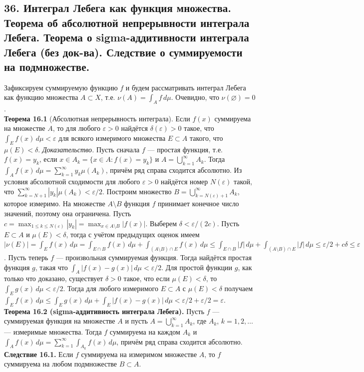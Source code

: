 \documentclass[12pt]{article}
\begin{document}
\subsection*{36. Интеграл Лебега как функция множества. Теорема об абсолютной непрерывности
интеграла Лебега. Теорема о sigma-аддитивности интеграла Лебега (без док-ва). Следствие
о суммируемости на подмножестве.}
Зафиксируем суммируемую функцию $f$ и будем рассматривать интеграл Лебега как функцию множества $A \subset X$, т.е. $\nu(A) = \int_A f\,d\mu$. Очевидно, что $\nu(\varnothing) = 0$. \\\textbf{Теорема 16.1} (Абсолютная непрерывность интеграла). Если $f(x)$ суммируема на множестве $A$, то для любого $\varepsilon > 0$ найдётся $\delta(\varepsilon) > 0$ такое, что $\int_E f(x)\,d\mu < \varepsilon$ для всякого измеримого множества $E \subset A$ такого, что $\mu(E) < \delta$. \textit{Доказательство.} Пусть сначала $f$ — простая функция, т.е. $f(x) = y_k$, если $x \in A_k = \{x \in A : f(x) = y_k\}$ и $A = \bigcup_{k=1}^\infty A_k$. Тогда $\int_A f(x)\,d\mu = \sum_{k=1}^\infty y_k \mu(A_k)$, причём ряд справа сходится абсолютно. Из условия абсолютной сходимости для любого $\varepsilon > 0$ найдётся номер $N(\varepsilon)$ такой, что $\sum_{k=N+1}^\infty |y_k|\mu(A_k) < \varepsilon/2$. Построим множество $B = \bigcup_{k=N(\varepsilon)+1}^\infty A_k$, которое измеримо. На множестве $A \setminus B$ функция $f$ принимает конечное число значений, поэтому она ограничена. Пусть $c = \max_{1 \leq k \leq N(\varepsilon)} |y_k| = \max_{x \in A\setminus B} |f(x)|$. Выберем $\delta < \varepsilon/(2c)$. Пусть $E \subset A$ и $\mu(E) < \delta$, тогда с учётом предыдущих оценок имеем $|\nu(E)| = \int_E f(x)\,d\mu = \int_{E \cap B} f(x)\,d\mu + \int_{(A\setminus B)\cap E} f(x)\,d\mu \leq \int_{E \cap B} |f|\,d\mu + \int_{(A\setminus B)\cap E} |f|\,d\mu \leq \varepsilon/2 + c\delta \leq \varepsilon$. Пусть теперь $f$ — произвольная суммируемая функция. Тогда найдётся простая функция $g$, такая что $\int_A |f(x)-g(x)|\,d\mu < \varepsilon/2$. Для простой функции $g$, как только что доказано, существует $\delta > 0$ такое, что если $\mu(E) < \delta$, то $\int_E g(x)\,d\mu < \varepsilon/2$. Тогда для любого измеримого $E \subset A$ с $\mu(E) < \delta$ получаем $\int_E f(x)\,d\mu \leq \int_E g(x)\,d\mu + \int_E |f(x)-g(x)|\,d\mu < \varepsilon/2 + \varepsilon/2 = \varepsilon$. \\\textbf{Теорема 16.2 (sigma-аддитивность интеграла Лебега).} Пусть $f$ — суммируемая функция на множестве $A$ и пусть $A = \bigcup_{k=1}^\infty A_k$, где $A_k$, $k=1,2,\dots$ — измеримые множества. Тогда $f$ суммируема на каждом $A_k$ и $\int_A f(x)\,d\mu = \sum_{k=1}^\infty \int_{A_k} f(x)\,d\mu$, причём ряд справа сходится абсолютно. \\\textbf{Следствие 16.1.} Если $f$ суммируема на измеримом множестве $A$, то $f$ суммируема на любом подмножестве $B \subset A$.
\end{document}
